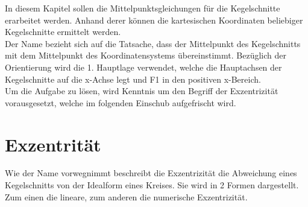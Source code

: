 \setcounter{section}{0}
In diesem Kapitel sollen die Mittelpunktsgleichungen für die Kegelschnitte erarbeitet werden. Anhand derer können die kartesischen Koordinaten beliebiger Kegelschnitte ermittelt werden.\\
Der Name bezieht sich auf die Tatsache, dass der Mittelpunkt des Kegelschnitts mit dem Mittelpunkt des Koordinatensystems übereinstimmt. Bezüglich der Orientierung wird die 1. Hauptlage verwendet, welche die Hauptachsen der Kegelschnitte auf die x-Achse legt und F1 in den positiven x-Bereich.\\
Um die Aufgabe zu lösen, wird Kenntnis um den Begriff der Exzentrizität vorausgesetzt, welche im folgenden Einschub aufgefrischt wird.
\section{Exzentrität}
Wie der Name vorwegnimmt beschreibt die Exzentrizität die Abweichung eines Kegelschnitts von der Idealform eines Kreises. Sie wird in 2 Formen dargestellt. Zum einen die lineare, zum anderen die numerische Exzentrizität.
